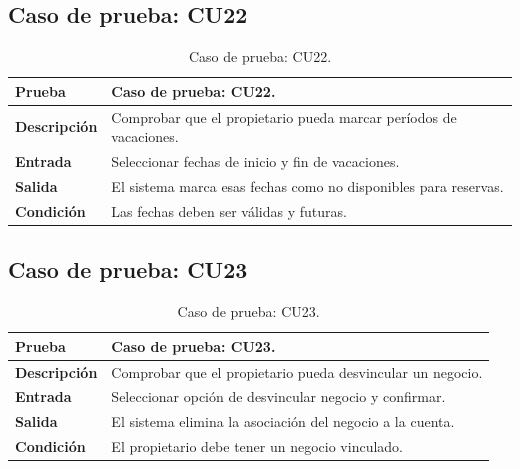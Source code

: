 
\subsection{Caso de prueba: CU22}

\begin{table}[ht]
\centering
\renewcommand{\arraystretch}{1.3}
\begin{tabular}{|p{3cm}|p{12cm}|}
\hline
\rowcolor[RGB]{191,191,191}
\textbf{Prueba} & Caso de prueba: CU22. \\
\hline
\textbf{Descripción} \cellcolor[RGB]{217,217,217} & Comprobar que el propietario pueda marcar períodos de vacaciones. \\
\hline
\textbf{Entrada} \cellcolor[RGB]{217,217,217} & Seleccionar fechas de inicio y fin de vacaciones. \\
\hline
\textbf{Salida} \cellcolor[RGB]{217,217,217} & El sistema marca esas fechas como no disponibles para reservas. \\
\hline
\textbf{Condición} \cellcolor[RGB]{217,217,217} & Las fechas deben ser válidas y futuras. \\
\hline
\end{tabular}
\caption{Caso de prueba: CU22.}
\label{tab:cu22_black_test}
\end{table}


\subsection{Caso de prueba: CU23}

\begin{table}[ht]
\centering
\renewcommand{\arraystretch}{1.3}
\begin{tabular}{|p{3cm}|p{12cm}|}
\hline
\rowcolor[RGB]{191,191,191}
\textbf{Prueba} & Caso de prueba: CU23. \\
\hline
\textbf{Descripción} \cellcolor[RGB]{217,217,217} & Comprobar que el propietario pueda desvincular un negocio. \\
\hline
\textbf{Entrada} \cellcolor[RGB]{217,217,217} & Seleccionar opción de desvincular negocio y confirmar. \\
\hline
\textbf{Salida} \cellcolor[RGB]{217,217,217} & El sistema elimina la asociación del negocio a la cuenta. \\
\hline
\textbf{Condición} \cellcolor[RGB]{217,217,217} & El propietario debe tener un negocio vinculado. \\
\hline
\end{tabular}
\caption{Caso de prueba: CU23.}
\label{tab:cu23_black_test}
\end{table}

